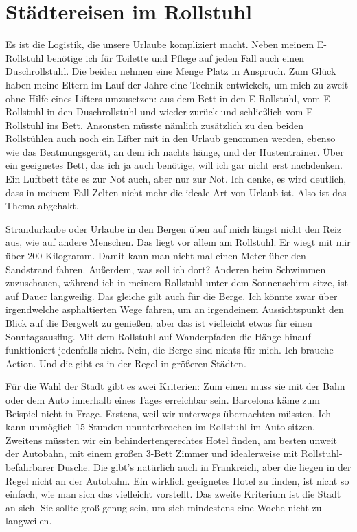 \documentclass[fontsize=14pt,a4paper,headinclude,DIV=calc,automark]{scrbook}
\begin{document}
\section{Städtereisen im Rollstuhl}

Es ist die Logistik, die unsere Urlaube kompliziert macht. Neben meinem E-Rollstuhl benötige ich für Toilette und Pflege auf jeden Fall auch einen Duschrollstuhl. Die beiden nehmen eine Menge Platz in Anspruch. Zum Glück haben meine Eltern im Lauf der Jahre eine Technik entwickelt, um mich zu zweit ohne Hilfe eines Lifters umzusetzen: aus dem Bett in den E-Rollstuhl, vom E-Rollstuhl in den Duschrollstuhl und wieder zurück und schließlich vom E-Rollstuhl ins Bett. Ansonsten müsste nämlich zusätzlich zu den beiden Rollstühlen auch noch ein Lifter mit in den Urlaub genommen werden, ebenso wie das Beatmungsgerät, an dem ich nachts hänge, und der Hustentrainer. Über ein geeignetes Bett, das ich ja auch benötige, will ich gar nicht erst nachdenken. Ein Luftbett täte es zur Not auch, aber nur zur Not. Ich denke, es wird deutlich, dass in meinem Fall Zelten nicht mehr die ideale Art von Urlaub ist. Also ist das Thema abgehakt. 

Strandurlaube oder Urlaube in den Bergen üben auf mich längst nicht den Reiz aus, wie auf andere Menschen. Das liegt vor allem am Rollstuhl. Er wiegt mit mir über 200 Kilogramm. Damit kann man nicht mal einen Meter über den Sandstrand fahren. Außerdem, was soll ich dort? Anderen beim Schwimmen zuzuschauen, während ich in meinem Rollstuhl unter dem Sonnenschirm sitze, ist auf Dauer langweilig. Das gleiche gilt auch für die Berge. Ich könnte zwar über irgendwelche asphaltierten Wege fahren, um an irgendeinem Aussichtspunkt den Blick auf die Bergwelt zu genießen, aber das ist vielleicht etwas für einen Sonntagsausflug. Mit dem Rollstuhl auf Wanderpfaden die Hänge hinauf funktioniert jedenfalls nicht. Nein, die Berge sind nichts für mich. Ich brauche Action. Und die gibt es in der Regel in größeren Städten.

Für die Wahl der Stadt gibt es zwei Kriterien: Zum einen muss sie mit der Bahn oder dem Auto innerhalb eines Tages erreichbar sein. Barcelona käme zum Beispiel nicht in Frage. Erstens, weil wir unterwegs übernachten müssten. Ich kann unmöglich 15 Stunden ununterbrochen im Rollstuhl im Auto sitzen. Zweitens müssten wir ein behindertengerechtes Hotel finden, am besten unweit der Autobahn, mit einem großen 3-Bett Zimmer und idealerweise mit Rollstuhl-befahrbarer Dusche. Die gibt’s natürlich auch in Frankreich, aber die liegen in der Regel nicht an der Autobahn. Ein wirklich geeignetes Hotel zu finden, ist nicht so einfach, wie man sich das vielleicht vorstellt. Das zweite Kriterium ist die Stadt an sich. Sie sollte groß genug sein, um sich mindestens eine Woche nicht zu langweilen. 
\end{document}
